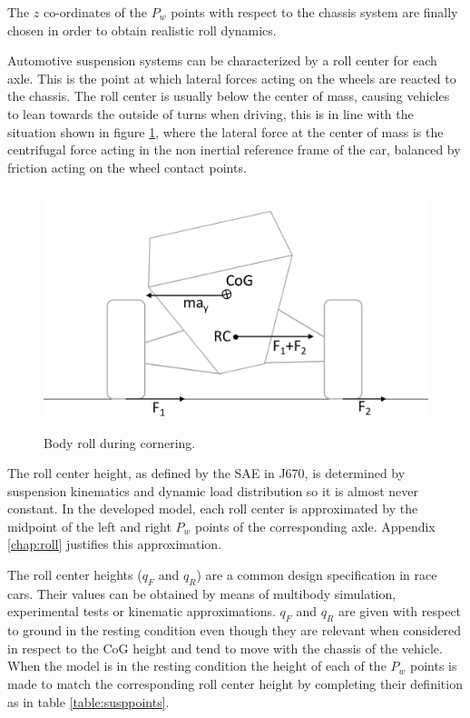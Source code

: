 The $z$ co-ordinates of the $P_w$ points with respect to the chassis system are finally chosen in order to obtain realistic roll dynamics.

Automotive suspension systems can be characterized by a roll center for each axle. This is the point at which lateral forces acting on the wheels are reacted to the chassis.
The roll center is usually below the center of mass, causing vehicles to lean towards the outside of turns when driving, this is in line with the situation shown in figure \ref{roll}, where the lateral force at the center of mass is the centrifugal force acting in the non inertial reference frame of the car, balanced by friction acting on the wheel contact points.

\begin{figure}[ht]
  \centering
  \includegraphics[height = 7cm]{images/roll}
  \caption{Body roll during cornering.}
  \label{roll}
\end{figure}

The roll center height, as defined by the SAE in J670, is determined by suspension kinematics and dynamic load distribution so it is almost never constant.
In the developed model, each roll center is approximated by the midpoint of the left and right $P_w$ points of the corresponding axle. Appendix \ref{chap:roll} justifies this approximation.

The roll center heights ($q_F$ and $q_R$) are a common design specification in race cars.
Their values can be obtained by means of multibody simulation, experimental tests or kinematic approximations.
$q_F$ and $q_R$  are given with respect to ground in the resting condition even though they are relevant when considered in respect to the CoG height and tend to move with the chassis of the vehicle.
When the model is in the resting condition the height of each of the $P_w$ points is made to match the corresponding roll center height by completing their definition as in table \ref{table:susppoints}.

